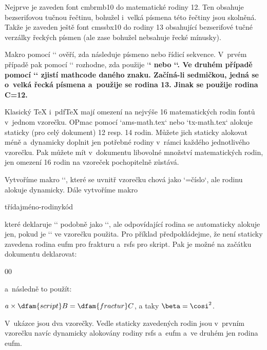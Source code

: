 Nejprve je zaveden font cmbrmb10 do matematické rodiny 12. Ten obsahuje bezserifovou tučnou řečtinu, bohužel i~velká písmena této řečtiny jsou skolněná. Takže je zaveden ještě font cmssbx10 do rodiny 13 obsahující  bezserifové tučné verzálky řeckých písmen (ale zase bohužel nebsahuje řecké mínusky). 



Makro pomocí `\string` ověří, zda následuje písmeno nebo řídicí sekvence. V~prvém případě pak pomocí `\lccode` rozhodne, zda použije `\bf` nebo `\bi`. Ve druhém případě pomocí `\meaning` zjistí mathcode daného znaku. Začíná-li sedmičkou, jedná se o~velká řecká písmena a~použije se rodina 13. Jinak se použije rodina C=12. 


 


Klasický TeX i~pdfTeX mají omezení na nejvýše 16 matematických rodin fontů v~jednom vzorečku. OPmac pomocí `ams-math.tex` nebo `tx-math.tex` alokuje staticky (pro celý dokument) 12 resp. 14 rodin. Můžete jich staticky alokovat méně a~dynamicky doplnit jen potřebné rodiny v~rámci každého jednotlivého vzorečku. Pak můžete mít v~dokumentu libovolné množství matematických rodin, jen omezení 16 rodin na vzoreček pochopitelně zůstává. 



Vytvoříme makro ``, které se uvnitř vzorečku chová jako `\fam=číslo`, ale rodinu alokuje dynamicky. Dále vytvoříme makro 

\begtt
\dmathchardef\sekvence třída{jméno-rodiny}kód 
\endtt


které deklaruje `\sekvenci` podobně jako `\matchardef`, ale odpovídající rodina se automaticky alokuje jen, pokud je `\sekvence` ve vzorečku použita. Pro příklad předpokládejme, že není staticky zavedena rodina eufm pro frakturu a~rsfs pro skript. Pak je možné na začátku dokumentu deklarovat: 

\begtt
   \def\fractur{\dfam{fractur}} 
    \def\script{\dfam{script}} 
\dmathchardef{}00  %
\endtt


a~následně to použít: 

\begtt
$a \times {\script B} = {\fractur C}$, a taky $ \beta = \cosi^2 $. 
\endtt


V~ukázce jsou dva vzorečky. Vedle staticky zavedených rodin jsou v~prvním vzorečku navíc dynamicky alokovány rodiny rsfs a~eufm a~ve druhém jen rodina eufm. 



